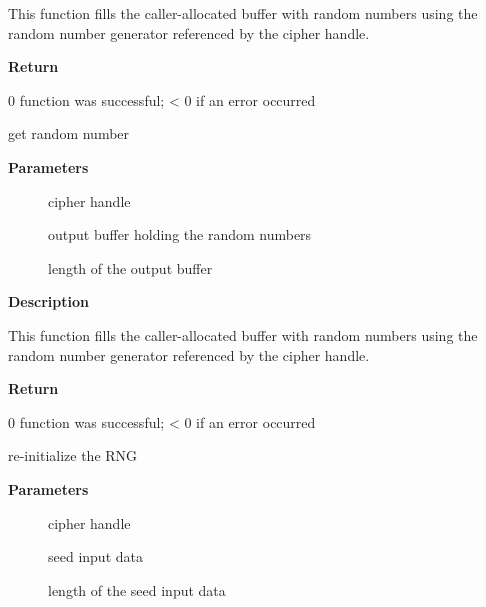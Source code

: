 \documentclass[a4paper,8pt,english]{sphinxmanual}
\begin{document}
This function fills the caller-allocated buffer with random
numbers using the random number generator referenced by the
cipher handle.

\textbf{Return}

0 function was successful; \textless{} 0 if an error occurred

\begin{fulllineitems}
\label{crypto/api-rng:c.crypto_rng_get_bytes}
get random number

\end{fulllineitems}


\textbf{Parameters}
\begin{description}
\item[{}] \leavevmode
cipher handle

\item[{}] \leavevmode
output buffer holding the random numbers

\item[{}] \leavevmode
length of the output buffer

\end{description}

\textbf{Description}

This function fills the caller-allocated buffer with random numbers using the
random number generator referenced by the cipher handle.

\textbf{Return}

0 function was successful; \textless{} 0 if an error occurred

\begin{fulllineitems}
\label{crypto/api-rng:c.crypto_rng_reset}
re-initialize the RNG

\end{fulllineitems}


\textbf{Parameters}
\begin{description}
\item[{}] \leavevmode
cipher handle

\item[{}] \leavevmode
seed input data

\item[{}] \leavevmode
length of the seed input data

\end{description}
\end{document}
